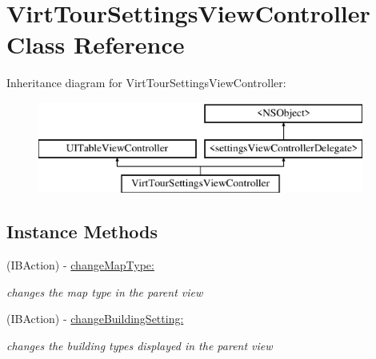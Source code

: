 \hypertarget{interface_virt_tour_settings_view_controller}{\section{Virt\-Tour\-Settings\-View\-Controller Class Reference}
\label{interface_virt_tour_settings_view_controller}
}
Inheritance diagram for Virt\-Tour\-Settings\-View\-Controller\-:\begin{figure}[H]
\begin{center}
\leavevmode
\includegraphics[height=3.000000cm]{interface_virt_tour_settings_view_controller}
\end{center}
\end{figure}
\subsection*{Instance Methods}
\begin{DoxyCompactItemize}
\item 
(I\-B\-Action) -\/ \hyperlink{interface_virt_tour_settings_view_controller_add7a84f70a00533303b14e168d9eef9c}{change\-Map\-Type\-:}
\begin{DoxyCompactList}\small\item\em changes the map type in the parent view \end{DoxyCompactList}\item 
(I\-B\-Action) -\/ \hyperlink{interface_virt_tour_settings_view_controller_a3f23e3109a92dab6c73f13e22ed315b2}{change\-Building\-Setting\-:}
\begin{DoxyCompactList}\small\item\em changes the building types displayed in the parent view \end{DoxyCompactList}\end{DoxyCompactItemize}
